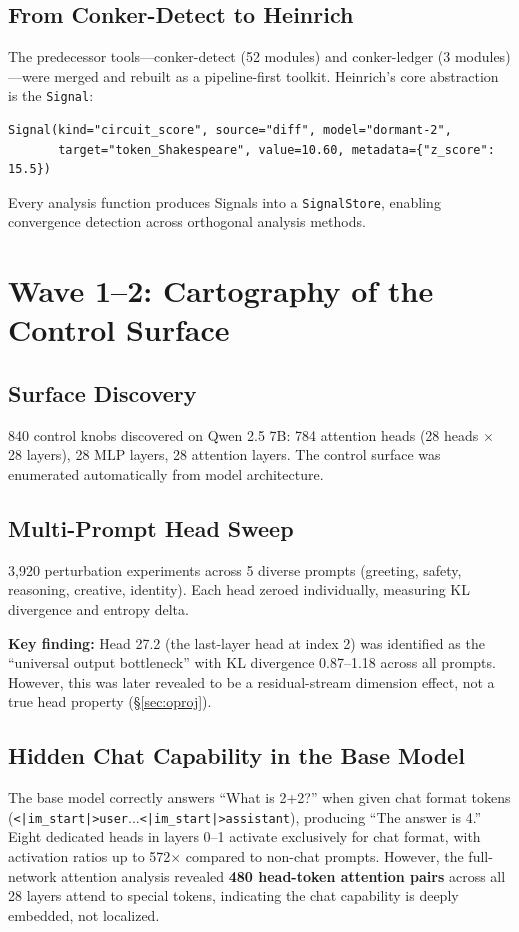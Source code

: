 \documentclass[11pt,a4paper]{article}
\begin{document}
\subsection{From Conker-Detect to Heinrich}
The predecessor tools---conker-detect (52 modules) and conker-ledger (3 modules)---were merged and rebuilt as a pipeline-first toolkit. Heinrich's core abstraction is the \texttt{Signal}:
\begin{verbatim}
Signal(kind="circuit_score", source="diff", model="dormant-2",
       target="token_Shakespeare", value=10.60, metadata={"z_score": 15.5})
\end{verbatim}
Every analysis function produces Signals into a \texttt{SignalStore}, enabling convergence detection across orthogonal analysis methods.

\section{Wave 1--2: Cartography of the Control Surface}

\subsection{Surface Discovery}
840 control knobs discovered on Qwen 2.5 7B: 784 attention heads (28 heads $\times$ 28 layers), 28 MLP layers, 28 attention layers. The control surface was enumerated automatically from model architecture.

\subsection{Multi-Prompt Head Sweep}
3,920 perturbation experiments across 5 diverse prompts (greeting, safety, reasoning, creative, identity). Each head zeroed individually, measuring KL divergence and entropy delta.

\textbf{Key finding:} Head 27.2 (the last-layer head at index 2) was identified as the ``universal output bottleneck'' with KL divergence 0.87--1.18 across all prompts. However, this was later revealed to be a residual-stream dimension effect, not a true head property (\S\ref{sec:oproj}).

\subsection{Hidden Chat Capability in the Base Model}
\label{sec:chat_backdoor}
The base model correctly answers ``What is 2+2?'' when given chat format tokens (\texttt{<|im\_start|>user}...\texttt{<|im\_start|>assistant}), producing ``The answer is 4.'' Eight dedicated heads in layers 0--1 activate exclusively for chat format, with activation ratios up to 572$\times$ compared to non-chat prompts. However, the full-network attention analysis revealed \textbf{480 head-token attention pairs} across all 28 layers attend to special tokens, indicating the chat capability is deeply embedded, not localized.
\end{document}
